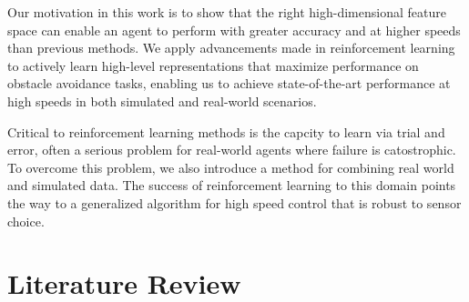 \documentclass[paper=a4, fontsize=11pt]{scrartcl} %
\begin{document}
	Our motivation in this work is to show that the right high-dimensional feature space can enable an agent to perform with greater accuracy and at higher speeds than previous methods.
	We apply advancements made in reinforcement learning to actively learn high-level representations that maximize performance on obstacle avoidance tasks, enabling us to achieve state-of-the-art performance at high speeds in both simulated and real-world scenarios. 

	Critical to reinforcement learning methods is the capcity to learn via trial and error, often a serious problem for real-world agents where failure is catostrophic.
	To overcome this problem, we also introduce a method for combining real world and simulated data.
	The success of reinforcement learning to this domain points the way to a generalized algorithm for high speed control that is robust to sensor choice.

\section{Literature Review}
\end{document}
